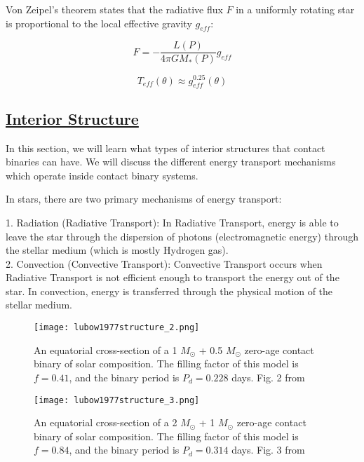 \documentclass[12pt]{article} %
\numberwithin{equation}{section} %
\begin{document}
Von Zeipel's theorem states that the radiative flux $F$ in a uniformly rotating star is proportional to the local effective gravity $g_{eff}$:

\begin{equation} \label{von_zeipel}
F = - \frac{L(P)}{4\pi G M_{*}(P)}g_{eff}
\end{equation}

\begin{equation} \label{von_zeipel_2}
T_{eff}(\theta) \approx g_{eff}^{0.25}(\theta)
\end{equation}

\citep{von1924radiative.bib}


\citep{gazeas2006masses}

\subsection[Interior Structure]{\hyperlink{toc}{Interior Structure}} \label{sec: Interior Structure}

In this section, we will learn what types of interior structures that contact binaries can have. We will discuss the different energy transport mechanisms which operate inside contact binary systems.

In stars, there are two primary mechanisms of energy transport:

1. Radiation (Radiative Transport): In Radiative Transport, energy is able to leave the star through the dispersion of photons (electromagnetic energy) through the stellar medium (which is mostly Hydrogen gas). \\

2. Convection (Convective Transport): Convective Transport occurs when Radiative Transport is not efficient enough to transport the energy out of the star. In convection, energy is transferred through the physical motion of the stellar medium. \\

\begin{figure}[H]
\centering
\texttt{[image: lubow1977structure\_2.png]}
\caption{An equatorial cross-section of a 1 $M_{\odot}$ + 0.5 $M_{\odot}$ zero-age contact binary of solar composition. The filling factor of this model is $f = 0.41$, and the binary period is $P_{d} = 0.228$ days. Fig. 2 from \citet{lubow1977structure}}
\label{fig: lubow1977structure_2}
\end{figure}

\begin{figure}[H]
\centering
\texttt{[image: lubow1977structure\_3.png]}
\caption{An equatorial cross-section of a 2 $M_{\odot}$ + 1 $M_{\odot}$ zero-age contact binary of solar composition. The filling factor of this model is $f = 0.84$, and the binary period is $P_{d} = 0.314$ days. Fig. 3 from \citet{lubow1977structure}}
\label{fig: lubow1977structure_3}
\end{figure}
\end{document}
